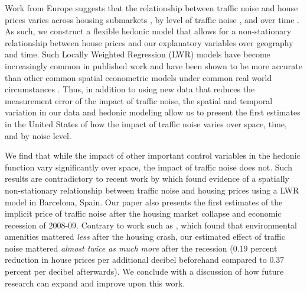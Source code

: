 \documentclass{article}\usepackage[]{graphicx}\usepackage[]{color}
\begin{document}

Work from Europe suggests that the relationship between traffic noise and house prices varies across housing submarkets \citep{Day2007, MarmolejoDuarteCarlos;GonzalezTamez2009}, by level of traffic noise \citep{Theebe2004a, Brandt2011}, and over time \cite{Wilhelmsson2000}. As such, we construct a flexible hedonic model that allows for a non-stationary relationship between house prices and our explanatory variables over geography and time. Such Locally Weighted Regression (LWR) models have become increasingly common in published work \citep[see][]{MarmolejoDuarteCarlos;GonzalezTamez2009, Carruthers2010, Sunding2010, Nappi-Choulet2011} and have been shown to be more accurate than other common spatial econometric models under common real world circumstances \citep{McMillen2012}. Thus, in addition to using new data that reduces the measurement error of the impact of traffic noise, the spatial and temporal variation in our data and hedonic modeling allow us to present the first estimates in the United States of how the impact of traffic noise varies over space, time, and by noise level. 

We find that while the impact of other important control variables in the hedonic function vary significantly over space, the impact of traffic noise does not. Such results are contradictory to recent work by \citet{MarmolejoDuarteCarlos;GonzalezTamez2009} which found evidence of a spatially non-stationary relationship between traffic noise and housing prices using a LWR model in Barcelona, Spain. Our paper also presents the first estimates of the implicit price of traffic noise after the housing market collapse and economic recession of 2008-09. Contrary to work such as \citet{Cho2011b}, which found that environmental amenities mattered \emph{less} after the housing crash, our estimated effect of traffic noise mattered \emph{almost twice as much more} after the recession (0.19 percent reduction in house prices per additional decibel beforehand compared to 0.37 percent per decibel afterwards). We conclude with a discussion of how future research can expand and improve upon this work.
 
\end{document}
